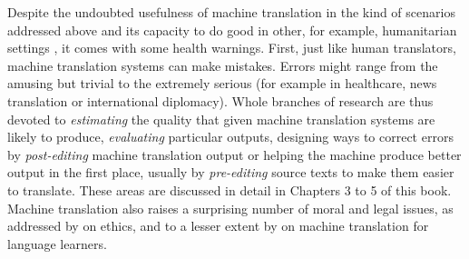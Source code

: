 \documentclass[output=paper]{langscibook}
\begin{document}
Despite the undoubted usefulness of machine translation in the kind of scenarios addressed above and its capacity to do good in other, for example, humanitarian settings \citep{Nurminen2020}, it comes with some health warnings. First, just like human translators, machine translation systems can make mistakes. Errors might range from the amusing but trivial to the extremely serious (for example in healthcare, news translation or international diplomacy). Whole branches of research are thus devoted to \textit{estimating} the quality that given machine translation systems are likely to produce, \textit{evaluating} particular outputs,  designing ways to correct errors by \textit{post-editing} machine translation output or helping the machine produce better output in the first place, usually by \textit{pre-editing} source texts to make them easier to translate. These areas are discussed in detail in Chapters 3 to 5 of this book. Machine translation also raises a surprising number of moral and legal issues, as addressed by  on ethics, and to a lesser extent by  on machine translation for language learners.
\end{document}
